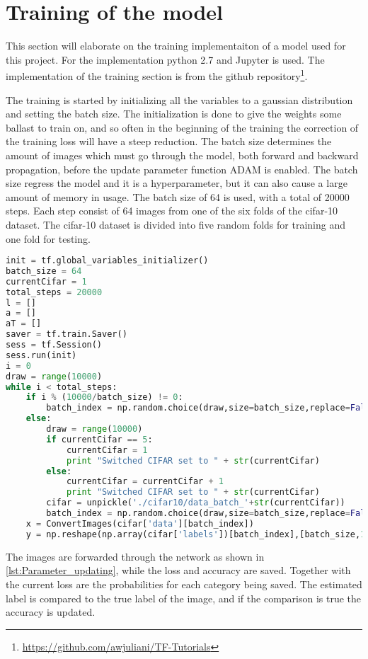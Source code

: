 \section{Training of the model}

This section will elaborate on the training implementaiton of a model used for this project. For the implementation python 2.7 and Jupyter is used. The implementation of the training section is from the github repository\footnote{\url{https://github.com/awjuliani/TF-Tutorials}}.

The training is started by initializing all the variables to a gaussian distribution and setting the batch size. The initialization is done to give the weights some ballast to train on, and so often in the beginning of the training the correction of the training loss will have a steep reduction. The batch size determines the amount of images which must go through the model, both forward and backward propagation, before the update parameter function ADAM is enabled. The batch size regress the model and it is a hyperparameter, but it can also cause a large amount of memory in usage. The batch size of 64 is used, with a total of 20000 steps. Each step consist of 64 images from one of the six folds of the cifar-10 dataset. The cifar-10 dataset is divided into five random folds for training and one fold for testing.
\begin{lstlisting}[language=Python, label=lst:trainingLoop, caption=for loop which finds the 64 training images for training the model]
init = tf.global_variables_initializer()
batch_size = 64
currentCifar = 1
total_steps = 20000
l = []
a = []
aT = []
saver = tf.train.Saver()
sess = tf.Session()
sess.run(init)
i = 0
draw = range(10000)
while i < total_steps:
	if i % (10000/batch_size) != 0:
		batch_index = np.random.choice(draw,size=batch_size,replace=False)
	else:
		draw = range(10000)
		if currentCifar == 5:
			currentCifar = 1
			print "Switched CIFAR set to " + str(currentCifar)
		else:
			currentCifar = currentCifar + 1
			print "Switched CIFAR set to " + str(currentCifar)
		cifar = unpickle('./cifar10/data_batch_'+str(currentCifar))
		batch_index = np.random.choice(draw,size=batch_size,replace=False)
	x = ConvertImages(cifar['data'][batch_index])  
	y = np.reshape(np.array(cifar['labels'])[batch_index],[batch_size,1])
\end{lstlisting}

The images are forwarded through the network as shown in \ref{lst:Parameter_updating}, while the loss and accuracy are saved. Together with the current loss are the probabilities for each category being saved. The estimated label is compared to the true label of the image, and if the comparison is true the accuracy is updated.

